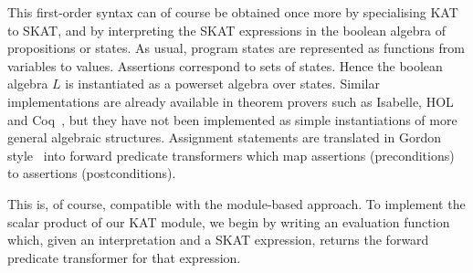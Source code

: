 \documentclass{llncs}
\begin{document}
This first-order syntax can of course be obtained once more by
specialising KAT to SKAT, and by interpreting the SKAT expressions in
the boolean algebra of propositions or states. As usual, program
states are represented as functions from variables to
values. Assertions correspond to sets of states. Hence the boolean
algebra $L$ is instantiated as a powerset algebra over states. Similar
implementations are already available in theorem provers such as
Isabelle, HOL and
Coq~\cite{Nipkow98,Schirmer,CollavizzaGordon,Nanevski}, but they
have not been implemented as simple instantiations of more general
algebraic structures. Assignment statements are translated in Gordon
style~\cite{CollavizzaGordon} into forward predicate transformers
which map assertions (preconditions) to assertions (postconditions).

This is, of course, compatible with the module-based approach.  To
implement the scalar product of our KAT module, we begin by writing
an evaluation function which, given an interpretation and a SKAT
expression, returns the forward predicate transformer for that
expression.
\end{document}
